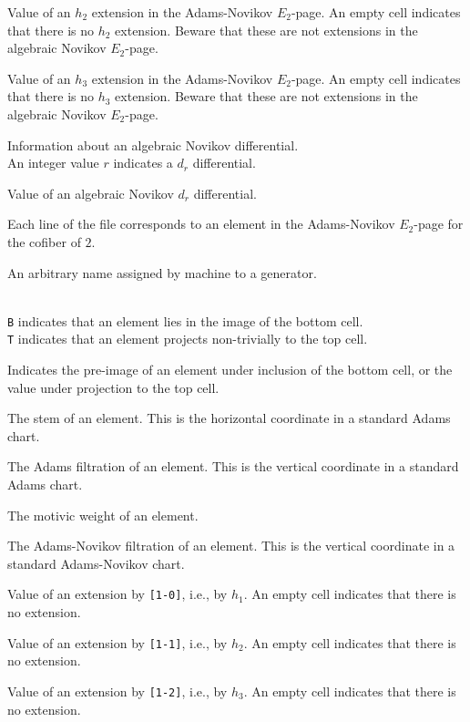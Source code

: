 \documentclass{amsart}
\begin{document}
 Value of an $h_2$ extension in the Adams-Novikov
$E_2$-page.  An empty cell indicates
that there is no $h_2$ extension.
Beware that these are not extensions in the algebraic Novikov
$E_2$-page.

 Value of an $h_3$ extension in the Adams-Novikov
$E_2$-page.  An empty cell indicates
that there is no $h_3$ extension.
Beware that these are not extensions in the algebraic Novikov
$E_2$-page.

Information about an algebraic Novikov differential. \\
An integer value $r$ indicates a $d_r$ differential.

Value of an algebraic Novikov $d_r$ differential.

\newpage

Each line of the file corresponds to an element in the
Adams-Novikov $E_2$-page for the cofiber of $2$.

An arbitrary name 
assigned by machine to a generator.

 \\
\texttt{B} indicates that an element lies in the image 
of the bottom cell.\\
\texttt{T} indicates that an element projects non-trivially to the
top cell.

Indicates the pre-image of an element under inclusion of the bottom cell,
or the value under projection to the top cell.

 The stem of an element.  This is the horizontal coordinate
in a standard Adams chart.

 The Adams filtration of 
an element.  This is the vertical coordinate in a standard 
Adams chart.

 The motivic weight of an element.

 The Adams-Novikov filtration
of an element.  This is the vertical coordinate in a standard
Adams-Novikov chart.

 Value of an extension by \texttt{[1-0]}, i.e.,
by $h_1$.
An empty cell indicates that there is no extension.

 Value of an extension by \texttt{[1-1]}, i.e., 
by $h_2$.
An empty cell indicates that there is no extension.

 Value of an extension by \texttt{[1-2]}, i.e.,
by $h_3$.
An empty cell indicates that there is no extension.
\end{document}
